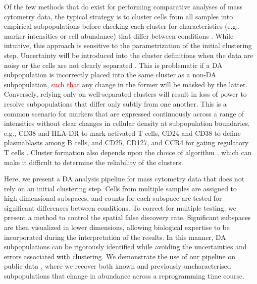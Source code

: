 \documentclass{article}
\newcommand\revised[1]{\textcolor{red}{#1}}
\begin{document}
Of the few methods that do exist for performing comparative analyses of mass cytometry data, the typical strategy is to cluster cells from all samples into empirical subpopulations before checking each cluster for characteristics (e.g., marker intensities or cell abundance) that differ between conditions \cite{anchang2016visualization,bruggner2014automated}.
While intuitive, this approach is sensitive to the parametrization of the initial clustering step.
Uncertainty will be introduced into the cluster definitions when the data are noisy or the cells are not clearly separated \cite{suzuki2006pvclust,kerr2001bootstrapping}.
This is problematic if a DA subpopulation is incorrectly placed into the same cluster as a non-DA subpopulation\revised{, such that} any change in the former will be masked by the latter.
Conversely, relying only on well-separated clusters will result in loss of power to resolve subpopulations that differ only subtly from one another.
This is a common scenario for markers that are expressed continuously across a range of intensities without clear changes in cellular density at subpopulation boundaries, e.g., CD38 and HLA-DR to mark activated T cells, CD24 and CD38 to define plasmablasts among B cells, and CD25, CD127, and CCR4 for gating regulatory T cells \cite{finak2016standardizing}.
Cluster formation also depends upon the choice of algorithm \cite{datta2003comparisons,wiwie2015comparing}, which can make it difficult to determine the reliability of the clusters.


Here, we present a DA analysis pipeline for mass cytometry data that does not rely on an initial clustering step.
Cells from multiple samples are assigned to high-dimensional subspaces, and counts for each subspace are tested for significant differences between conditions.
To correct for multiple testing, we present a method to control the spatial false discovery rate.
Significant subspaces are then visualized in lower dimensions, allowing biological expertise to be incorporated during the interpretation of the results.
In this manner, DA subpopulations can be rigorously identified while avoiding the uncertainties and errors associated with clustering.
We demonstrate the use of our pipeline on public data \cite{zunder2015continuous}, where we recover both known and previously uncharacterised subpopulations that change in abundance across a reprogramming time course.
\end{document}
